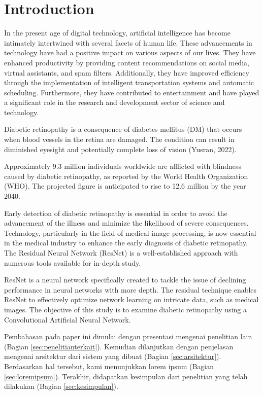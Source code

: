 \section{Introduction}
\label{sec:pendahuluan}


In the present age of digital technology, artificial intelligence has become intimately intertwined with several facets of human life. These advancements in technology have had a positive impact on various aspects of our lives. They have enhanced productivity by providing content recommendations on social media, virtual assistants, and spam filters. Additionally, they have improved efficiency through the implementation of intelligent transportation systems and automatic scheduling. Furthermore, they have contributed to entertainment and have played a significant role in the research and development sector of science and technology.
 
Diabetic retinopathy is a consequence of diabetes mellitus (DM) that occurs when blood vessels in the retina are damaged. The condition can result in diminished eyesight and potentially complete loss of vision (Yusran, 2022).

Approximately 9.3 million individuals worldwide are afflicted with blindness caused by diabetic retinopathy, as reported by the World Health Organization (WHO). The projected figure is anticipated to rise to 12.6 million by the year 2040.

Early detection of diabetic retinopathy is essential in order to avoid the advancement of the illness and minimize the likelihood of severe consequences. Technology, particularly in the field of medical image processing, is now essential in the medical industry to enhance the early diagnosis of diabetic retinopathy. The Residual Neural Network (ResNet) is a well-established approach with numerous tools available for in-depth study.

ResNet is a neural network specifically created to tackle the issue of declining performance in neural networks with more depth. The residual technique enables ResNet to effectively optimize network learning on intricate data, such as medical images. The objective of this study is to examine diabetic retinopathy using a Convolutional Artificial Neural Network. 


Pembahasan pada paper ini dimulai dengan presentasi mengenai penelitian lain (Bagian \ref{sec:penelitianterkait}).
Kemudian dilanjutkan dengan penjelasan mengenai arsitektur dari sistem yang dibuat (Bagian \ref{sec:arsitektur}).
Berdasarkan hal tersebut, kami menunjukkan lorem ipsum (Bagian \ref{sec:loremipsum}).
Terakhir, didapatkan kesimpulan dari penelitian yang telah dilakukan (Bagian \ref{sec:kesimpulan}).
